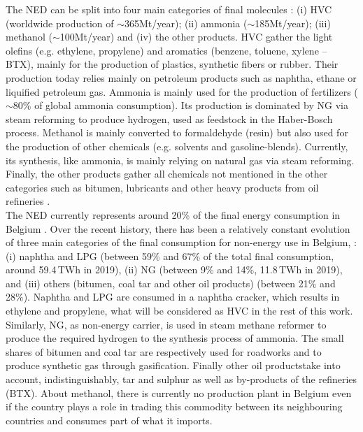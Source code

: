 The \gls{NED} can be split into four main categories of final molecules \cite{IEA2018_petrochemicals}: (i) \gls{HVC} (worldwide production of $\sim$365Mt/year); (ii) ammonia ($\sim$185Mt/year); (iii) methanol ($\sim$100Mt/year) and (iv) the other products. \Gls{HVC} gather the light olefins (e.g. ethylene, propylene) and aromatics (benzene, toluene, xylene – BTX), mainly for the production of plastics, synthetic fibers or rubber. Their production today relies mainly on petroleum products such as naphtha, ethane or liquified petroleum gas. Ammonia is  mainly used for the production of fertilizers ($\sim$80\% of global ammonia consumption). Its production is dominated by \gls{NG} via steam reforming to produce hydrogen, used as feedstock in the Haber-Bosch process. Methanol is mainly converted to formaldehyde (resin) but also used for the production of other chemicals (e.g. solvents and gasoline-blends). Currently, its synthesis, like ammonia, is mainly relying on natural gas via steam reforming. Finally, the other products gather all chemicals not mentioned in the other categories such as bitumen, lubricants and other heavy products from oil refineries \cite{daioglou2014energy}.\\

The \gls{NED} currently represents around 20\% of the final energy consumption in Belgium \cite{FPSEconomy2021}. Over the recent history, there has been a relatively constant evolution of three main categories of the final consumption for non-energy use in Belgium, \cite{statbel_NED_2019}: (i) naphtha and \gls{LPG} (between 59\% and 67\% of the total final consumption, around 59.4\,TWh in 2019), (ii) \gls{NG} (between 9\% and 14\%, 11.8\,TWh in 2019), and (iii) others (\ie bitumen, coal tar and other oil products) (between 21\% and 28\%). Naphtha and \gls{LPG} are consumed in a naphtha cracker, which results in ethylene and propylene, what will be considered as \gls{HVC} in the rest of this work. Similarly, \gls{NG}, as non-energy carrier, is used in steam methane reformer to produce the required hydrogen to the synthesis process of ammonia. The small shares of bitumen and coal tar are respectively used for roadworks and to produce synthetic gas through gasification. Finally \og other oil products\fg take into account, indistinguishably, tar and sulphur as well as by-products of the refineries (\eg \gls{BTX}). About methanol, there is currently no production plant in Belgium even if the country plays a role in trading this commodity between its neighbouring countries and consumes part of what it imports.\\

